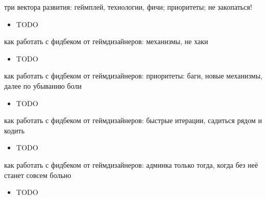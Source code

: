 \documentclass[aspectratio=169,handout,bigger]{beamer}
\begin{document}

\begin{frame}{три вектора развития: геймплей, технологии, фичи; приоритеты; не закопаться!}
  \begin{itemize}
    \item TODO
  \end{itemize}
\end{frame}


\begin{frame}{как работать с фидбеком от геймдизайнеров: механизмы, не хаки}
  \begin{itemize}
    \item TODO
  \end{itemize}
\end{frame}


\begin{frame}{как работать с фидбеком от геймдизайнеров: приоритеты: баги, новые механизмы, далее по убыванию боли}
  \begin{itemize}
    \item TODO
  \end{itemize}
\end{frame}


\begin{frame}{как работать с фидбеком от геймдизайнеров: быстрые итерации, садиться рядом и кодить}
  \begin{itemize}
    \item TODO
  \end{itemize}
\end{frame}


\begin{frame}{как работать с фидбеком от геймдизайнеров: админка только тогда, когда без неё станет совсем больно}
  \begin{itemize}
    \item TODO
  \end{itemize}
\end{frame}
\end{document}
